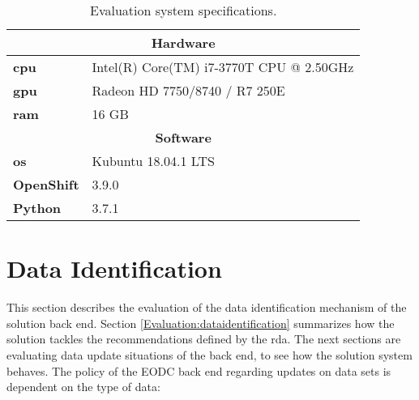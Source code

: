 \documentclass[draft,final]{vutinfth} %
\begin{document}
\begin{table}[]
	\caption{Evaluation system specifications.}
	\centering
	\begin{tabular}{l|l}
		\multicolumn{2}{c}{\textbf{Hardware}} \\ \hline
		\textbf{\acrshort{cpu}} & Intel(R) Core(TM) i7-3770T CPU @ 2.50GHz \\ 
		\textbf{\acrshort{gpu}} & Radeon HD 7750/8740 / R7 250E  \\ 
		\textbf{\acrshort{ram}} & 16 GB  \\ 
		\multicolumn{2}{c}{\textbf{Software}} \\ \hline
		\textbf{\acrshort{os}} & Kubuntu 18.04.1 LTS \\ 
		\textbf{OpenShift} & 3.9.0  \\ 
		\textbf{Python} & 3.7.1  \\ 
	\end{tabular}
	\label{Tab:eva_hardware}
\end{table}


\section{Data Identification}\label{Evaluation:special_dataid}
This section describes the evaluation of the data identification mechanism of the solution back end. Section \ref{Evaluation:dataidentification} summarizes how the solution tackles the recommendations defined by the \acrshort{rda}. The next sections are evaluating data update situations of the back end, to see how the solution system behaves. 
The policy of the EODC back end regarding updates on data sets is dependent on the type of data:
\end{document}
